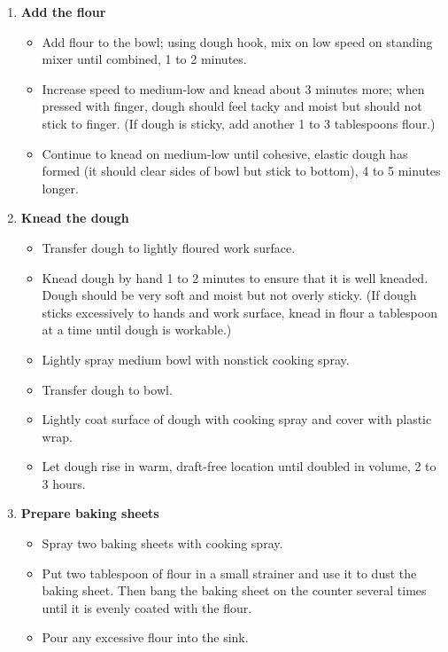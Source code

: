 \documentclass[11pt,letterpaper]{article}
\begin{document}
\begin{description}
\begin{enumerate}
	\item {\bf Add the flour}
		\begin{itemize}
		\item Add flour to  the bowl; using dough hook, mix on low speed on standing mixer until combined, 1 to 2 minutes. 
		\item Increase speed to medium-low and knead about 3 minutes more; when pressed with finger, dough should feel tacky and moist but should not stick
to finger. (If dough is sticky, add another 1 to 3 tablespoons flour.) 
		\item Continue to knead on medium-low until cohesive, elastic dough
has formed (it should clear sides of bowl but stick to bottom), 4 to 5 minutes longer.
		\end{itemize}
		
	\item {\bf Knead the dough}
		\begin{itemize}
		\item Transfer dough to lightly floured work surface. 
		\item Knead dough by hand 1 to 2 minutes to ensure that it is well kneaded. Dough
should be very soft and moist but not overly sticky. (If dough sticks excessively to hands and work surface, knead in flour a
tablespoon at a time until dough is workable.) 
		\item Lightly spray medium bowl with nonstick cooking spray. 
		\item Transfer dough to bowl.
		\item Lightly coat surface of dough with cooking spray and cover with plastic wrap. 
		\item Let dough rise in warm, draft-free location until doubled in volume, 2 to 3 hours.
		\end{itemize}
		
	\item {\bf Prepare baking sheets}
		\begin{itemize}
		\item Spray two baking sheets with cooking spray.
		\item Put two tablespoon of flour in a small strainer and use it to dust the baking sheet. Then bang the baking sheet on the counter several times until it is evenly coated with the flour.
		\item Pour any excessive flour into the sink. 
		\end{itemize}


\end{enumerate}
\end{description}
\end{document}
